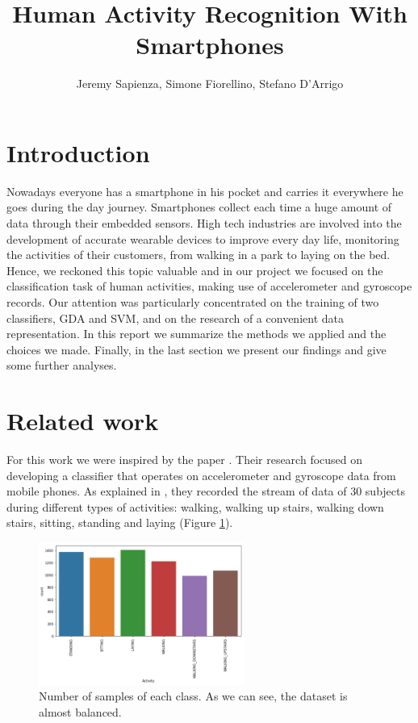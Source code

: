 \documentclass[a4paper,10pt,oneside]{article}
\title{Human Activity Recognition With Smartphones}
\author{Jeremy Sapienza, Simone Fiorellino, Stefano D'Arrigo}
\begin{document}
\maketitle




\section{Introduction}
Nowadays everyone has a smartphone in his pocket and carries it everywhere he goes during the day journey. Smartphones collect each time a huge amount of data through their embedded sensors. High tech industries are involved into the development of accurate wearable devices to improve every day life, monitoring the activities of their customers, from walking in a park to laying on the bed.\\
Hence, we reckoned this topic valuable and in our project we focused on the classification task of human activities, making use of accelerometer and gyroscope records. Our attention was particularly concentrated on the training of two classifiers, GDA and SVM,  and on the research of a convenient data representation.
In this report we summarize the methods we applied and the choices we made. Finally, in the last section we present our findings and give some further analyses.


\section{Related work}
For this work we were inspired by the paper \cite{brown2013activity}.
Their research focused on developing a classifier that operates on accelerometer and gyroscope data from mobile phones.
As explained in \cite{anuita2013human}, they recorded the stream of data of 30 subjects during different types of activities: walking, walking up stairs, walking down stairs, sitting, standing and laying (Figure \ref{fig:classes}).

\begin{figure}
 \center
 \includegraphics[width=0.6\textwidth]{class_distro}
 \caption{Number of samples of each class. As we can see, the dataset is almost balanced.}
 \label{fig:classes}
\end{figure}
\end{document}
